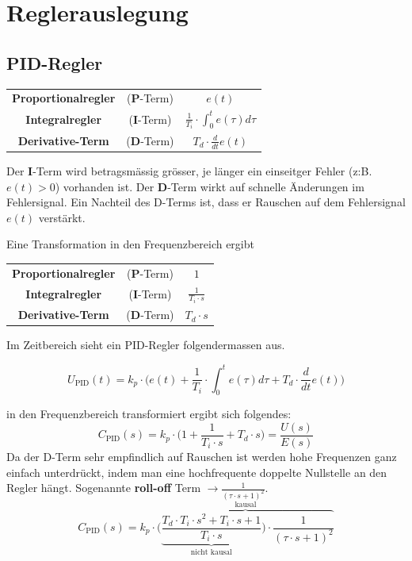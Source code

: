 \vfill\null\columnbreak
\section{Reglerauslegung}
    \subsection{PID-Regler}
        \begin{center}
           \begin{tabular}{|c|c|c|}
              \textbf{Proportionalregler}  & (\textbf{P}-Term) & $e(t)$ \\
               \textbf{Integralregler} & (\textbf{I}-Term) & $\frac{1}{T_i}\cdot\int_0^t e(\tau)d\tau$ \\
               \textbf{Derivative-Term} & (\textbf{D}-Term) & $T_d\cdot\frac{d}{dt}e(t)$
           \end{tabular}
        \end{center}
        Der \textbf{I}-Term wird betragsmässig grösser, je länger ein einseitger Fehler (z:B. $e(t) > 0$) vorhanden ist. 
        Der \textbf{D}-Term wirkt auf schnelle Änderungen im Fehlersignal. Ein Nachteil des D-Terms ist, dass er Rauschen auf dem Fehlersignal $e(t)$ verstärkt.
          
        Eine Transformation in den Frequenzbereich ergibt
        \begin{center}
        \begin{tabular}{|c|c|c|}
          \textbf{Proportionalregler}  & (\textbf{P}-Term) & $1$ \\
           \textbf{Integralregler} & (\textbf{I}-Term) & $\frac{1}{T_i\cdot s} $\\
           \textbf{Derivative-Term} & (\textbf{D}-Term) & $T_d\cdot s$
        \end{tabular}
        \end{center}
        
        Im Zeitbereich sieht ein PID-Regler folgendermassen aus.
        
       \[U_\textrm{PID}(t) = k_p\cdot\Bigg(e(t)+ \frac{1}{T_i}\cdot\int_0^t e(\tau)d\tau +T_d\cdot\frac{d}{dt}e(t)\Bigg)\]
       
       in den Frequenzbereich transformiert ergibt sich folgendes:
       \[C_\textrm{PID}(s) = k_p\cdot\Bigg(1+\frac{1}{T_i\cdot s} + T_d\cdot s\Bigg)=\frac{U(s)}{E(s)}
       \]
       Da der D-Term sehr empfindlich auf Rauschen ist werden hohe Frequenzen ganz einfach unterdrückt, indem man eine hochfrequente doppelte Nullstelle an den Regler hängt. Sogenannte \textbf{roll-off} Term $\rightarrow \frac{1}{(\tau\cdot s+1)^2}$.
       \[C_\textrm{PID}(s) = k_p \cdot\overbrace{\Bigg(\underbrace{\frac{T_d\cdot T_i\cdot s^2+T_i\cdot s+1}{T_i\cdot s}}_\textrm{nicht kausal}\Bigg)\cdot  \frac{1}{(\tau\cdot s+1)^2}}^\textrm{kausal}\]
       
